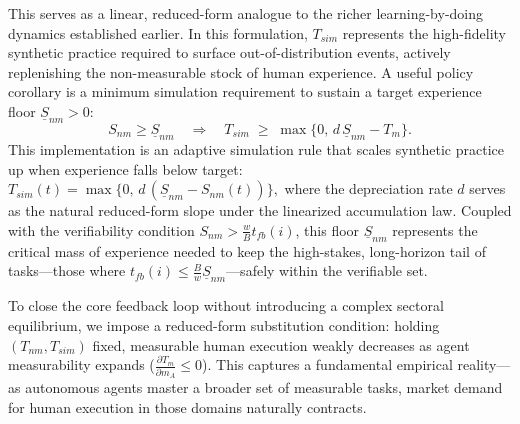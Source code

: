\documentclass[12pt, letter]{article}
\begin{document}
This serves as a linear, reduced-form analogue to the richer learning-by-doing dynamics established earlier. In this formulation, $T_{sim}$ represents the high-fidelity synthetic practice required to surface out-of-distribution events, actively replenishing the non-measurable stock of human experience. A useful policy corollary is a minimum simulation requirement to sustain a target experience floor $\underline{S}_{nm}>0$:
\[
S_{nm}\ge \underline{S}_{nm}
\quad\Rightarrow\quad
T_{sim} \;\ge\; \max\{0, \, d\,\underline{S}_{nm}-T_m\}.
\]
This implementation is an adaptive simulation rule that scales synthetic practice up when experience falls below target: $T_{sim}(t)=\max\{0,\,d\,(\underline{S}_{nm}-S_{nm}(t))\},$ where the depreciation rate $d$ serves as the natural reduced-form slope under the linearized accumulation law. Coupled with the verifiability condition $S_{nm}>\frac{w}{B}t_{fb}(i)$, this floor $\underline{S}_{nm}$ represents the critical mass of experience needed to keep the high-stakes, long-horizon tail of tasks—those where $t_{fb}(i)\le \frac{B}{w}\underline{S}_{nm}$—safely within the verifiable set.

To close the core feedback loop without introducing a complex sectoral equilibrium, we impose a reduced-form substitution condition: holding $(T_{nm},T_{sim})$ fixed, measurable human execution weakly decreases as agent measurability expands ($\frac{\partial T_m}{\partial m_A} \le 0$). This captures a fundamental empirical reality—as autonomous agents master a broader set of measurable tasks, market demand for human execution in those domains naturally contracts.
\end{document}
